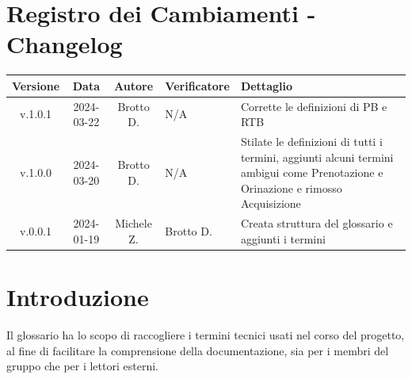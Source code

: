 \documentclass[12pt, oneside]{article}
\begin{document}
\section*{Registro dei Cambiamenti - Changelog}
\begin{tabular}{|c|c|c|p{3cm}|p{6cm}|}
\hline
\textbf{Versione} & \textbf{Data} & \textbf{Autore} & \textbf{Verificatore} & \textbf{Dettaglio} \\
\hline
v.1.0.1 & 2024-03-22 & Brotto D. & N/A & Corrette le definizioni di PB e RTB \\
\hline
v.1.0.0 & 2024-03-20 & Brotto D. & N/A & Stilate le definizioni di tutti i termini, aggiunti alcuni termini ambigui come Prenotazione e Orinazione e rimosso Acquisizione \\
\hline
v.0.0.1 & 2024-01-19 & Michele Z. & Brotto D. & Creata struttura del glossario e aggiunti i termini \\
\hline
\end{tabular}
\newpage

\tableofcontents
\newpage
\section{Introduzione}
Il glossario ha lo scopo di raccogliere i termini tecnici usati nel corso del progetto, al fine di facilitare la comprensione della documentazione, sia per i membri del gruppo che per i lettori esterni.
\newpage


























\end{document}
